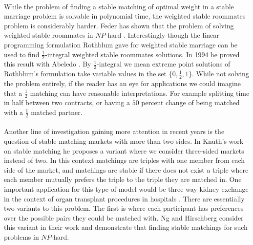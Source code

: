 \paragraph{}
While the problem of finding a stable matching of optimal weight in a stable marriage problem is solvable in polynomial time, the weighted stable roommates problem is considerably harder. Feder has shown that the problem of solving weighted stable roommates in $NP$-hard \cite{feder1992new}. Interestingly though the linear programming formulation Rothblum gave for weighted stable marriage can be used to find $\frac{1}{2}$-integral weighted stable roommates solutions. In 1994 he proved this result with Abeledo \cite{abeledo1994stable}. By $\frac{1}{2}$-integral we mean extreme point solutions of Rothblum's formulation take variable values in the set $\{0,\frac{1}{2},1\}$. While not solving the problem entirely, if the reader has an eye for applications we could imagine that a $\frac{1}{2}$ matching can have reasonable interpretations. For example splitting time in half between two contracts, or having a $50$ percent change of being matched with a $\frac{1}{2}$ matched partner.
\paragraph{}
Another line of investigation gaining more attention in recent years is the question of stable matching markets with more than two sides. In Knuth's work on stable matching he proposes a variant where we consider three-sided markets instead of two. In this context matchings are triples with one member from each side of the market, and matchings are stable if there does not exist a triple where each member mutually prefers the triple to the triple they are matched in. One important application for this type of model would be three-way kidney exchange in the context of organ transplant procedures in hospitals \cite{saidman2006increasing}. There are essentially two variants to this problem. The first is where each participant has preferences over the possible pairs they could be matched with.  Ng and Hirschberg \cite{ng1991three} consider this variant in their work and demonstrate that finding stable matchings for such problems in $NP$-hard.
